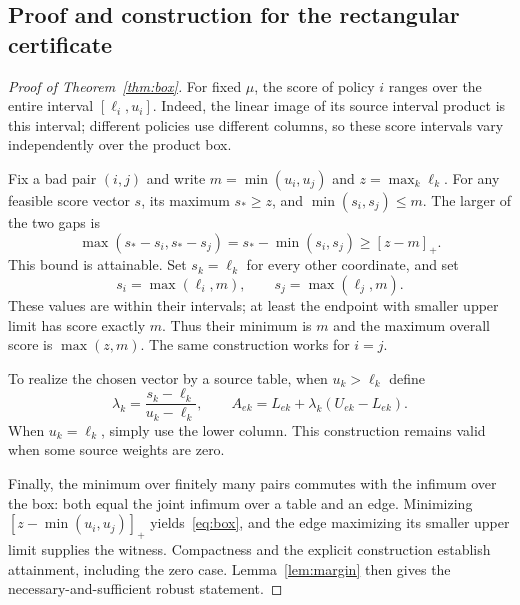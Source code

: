 \documentclass[11pt]{article}
\theoremstyle{definition}\newtheorem{definition}[theorem]{Definition}
\newcommand{\1}{\mathbf{1}}
\begin{document}
\subsection{Proof and construction for the rectangular certificate}
\begin{proof}[Proof of Theorem~\ref{thm:box}]
For fixed $\mu$, the score of policy $i$ ranges over the entire interval $[\ell_i,u_i]$. Indeed, the linear image of its source interval product is this interval; different policies use different columns, so these score intervals vary independently over the product box.

Fix a bad pair $(i,j)$ and write $m=\min(u_i,u_j)$ and $z=\max_k\ell_k$. For any feasible score vector $s$, its maximum $s_*\geq z$, and $\min(s_i,s_j)\leq m$. The larger of the two gaps is
\begin{equation*}
 \max(s_*-s_i,s_*-s_j)=s_*-\min(s_i,s_j)\geq[z-m]_+.
\end{equation*}
This bound is attainable. Set $s_k=\ell_k$ for every other coordinate, and set
\begin{equation*}
 s_i=\max(\ell_i,m),\qquad s_j=\max(\ell_j,m).
\end{equation*}
These values are within their intervals; at least the endpoint with smaller upper limit has score exactly $m$. Thus their minimum is $m$ and the maximum overall score is $\max(z,m)$. The same construction works for $i=j$.

To realize the chosen vector by a source table, when $u_k>\ell_k$ define
\begin{equation*}
 \lambda_k=\frac{s_k-\ell_k}{u_k-\ell_k},\qquad
 A_{ek}=L_{ek}+\lambda_k(U_{ek}-L_{ek}).
\end{equation*}
When $u_k=\ell_k$, simply use the lower column. This construction remains valid when some source weights are zero.

Finally, the minimum over finitely many pairs commutes with the infimum over the box: both equal the joint infimum over a table and an edge. Minimizing $[z-\min(u_i,u_j)]_+$ yields~\eqref{eq:box}, and the edge maximizing its smaller upper limit supplies the witness. Compactness and the explicit construction establish attainment, including the zero case. Lemma~\ref{lem:margin} then gives the necessary-and-sufficient robust statement.
\end{proof}
\end{document}
